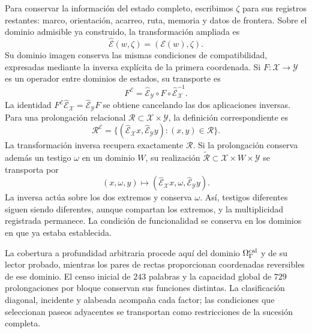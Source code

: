 Para conservar la información del estado completo, escribimos
\(\zeta\) para sus registros restantes: marco, orientación, acarreo,
ruta, memoria y datos de frontera. Sobre el dominio admisible ya
construido, la transformación ampliada es
\[
 \widehat{\mathcal E}(w,\zeta)=(\mathcal E(w),\zeta).
\]
Su dominio imagen conserva las mismas condiciones de compatibilidad,
expresadas mediante la inversa explícita de la primera coordenada. Si
\(F:\mathcal X\to\mathcal Y\) es un operador entre dominios de estados,
su transporte es
\[
 F^{\mathcal E}
 =\widehat{\mathcal E}_{\mathcal Y}\circ F
       \circ\widehat{\mathcal E}_{\mathcal X}^{-1}.
\]
La identidad \(F^{\mathcal E}\widehat{\mathcal E}_{\mathcal X}
=\widehat{\mathcal E}_{\mathcal Y}F\) se obtiene cancelando las dos
aplicaciones inversas. Para una prolongación relacional
\(\mathcal R\subset\mathcal X\times\mathcal Y\), la definición
correspondiente es
\[
 \mathcal R^{\mathcal E}
 =\{(\widehat{\mathcal E}_{\mathcal X}x,
       \widehat{\mathcal E}_{\mathcal Y}y):(x,y)\in\mathcal R\}.
\]
La transformación inversa recupera exactamente \(\mathcal R\).
Si la prolongación conserva además un testigo \(\omega\) en un dominio
\(W\), su realización \(\widetilde{\mathcal R}\subset
\mathcal X\times W\times\mathcal Y\) se transporta por
\[
 (x,\omega,y)\longmapsto
 (\widehat{\mathcal E}_{\mathcal X}x,\omega,
       \widehat{\mathcal E}_{\mathcal Y}y).
\]
La inversa actúa sobre los dos extremos y conserva \(\omega\). Así,
testigos diferentes siguen siendo diferentes, aunque compartan los
extremos, y la multiplicidad registrada permanece. La condición de
funcionalidad se conserva en los dominios en que ya estaba establecida.

La cobertura a profundidad arbitraria procede aquí del dominio
\(\Omega_\Gamma^{\rm cal}\) y de su lector probado, mientras los
pares de rectas proporcionan coordenadas reversibles de ese dominio.
El censo inicial de \(243\) palabras y la capacidad global de
\(729\) prolongaciones por bloque conservan sus funciones distintas.
La clasificación diagonal, incidente y alabeada acompaña cada factor;
las condiciones que seleccionan paseos adyacentes se transportan como
restricciones de la sucesión completa.
